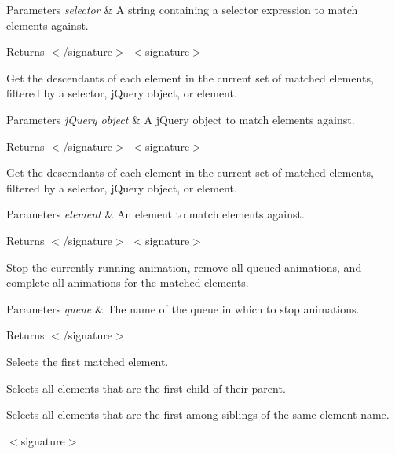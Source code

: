 \begin{DoxyParams}{Parameters}
{\em selector} & A string containing a selector expression to match elements against.\\
\hline
\end{DoxyParams}
\begin{DoxyReturn}{Returns}
$<$/signature$>$ $<$signature$>$ 

Get the descendants of each element in the current set of matched elements, filtered by a selector, j\+Query object, or element.
\end{DoxyReturn}

\begin{DoxyParams}{Parameters}
{\em j\+Query object} & A j\+Query object to match elements against.\\
\hline
\end{DoxyParams}
\begin{DoxyReturn}{Returns}
$<$/signature$>$ $<$signature$>$ 

Get the descendants of each element in the current set of matched elements, filtered by a selector, j\+Query object, or element.
\end{DoxyReturn}

\begin{DoxyParams}{Parameters}
{\em element} & An element to match elements against.\\
\hline
\end{DoxyParams}
\begin{DoxyReturn}{Returns}
$<$/signature$>$ $<$signature$>$ 

Stop the currently-\/running animation, remove all queued animations, and complete all animations for the matched elements.
\end{DoxyReturn}

\begin{DoxyParams}{Parameters}
{\em queue} & The name of the queue in which to stop animations.\\
\hline
\end{DoxyParams}
\begin{DoxyReturn}{Returns}
$<$/signature$>$ 

Selects the first matched element.
\end{DoxyReturn}


Selects all elements that are the first child of their parent.

Selects all elements that are the first among siblings of the same element name.

$<$signature$>$ 


